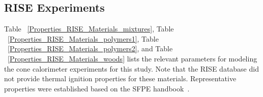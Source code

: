 \clearpage






\subsection{RISE Experiments}\label{sec_RISE_Materials}

Table ~\ref{Properties_RISE_Materials_mixtures}, Table ~\ref{Properties_RISE_Materials_polymers1}, Table ~\ref{Properties_RISE_Materials_polymers2}, and Table ~\ref{Properties_RISE_Materials_woods} lists the relevant parameters for modeling the cone calorimeter experiments for this study.
Note that the RISE database did not provide thermal ignition properties for these materials.
Representative properties were established based on the SFPE handbook~\cite{SFPE:Tewarson}.

